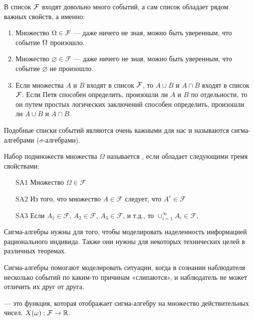 \documentclass[12pt, a4paper, oneside]{article}
\begin{document}
В список $\mathcal{F}$ входят довольно много событий, а сам список обладает рядом важных свойств, а именно:

\begin{enumerate}
\item  Множество $\Omega \in \mathcal{F}$ --- даже ничего не зная, можно быть уверенным, что событие $\Omega$ произошло.

\item  Множество $\varnothing \in \mathcal{F}$ --- даже ничего не зная, можно быть уверенным, что событие $\varnothing$ не произошло.

\item  Если множества $A$ и $B$ входят в список $\mathcal{F}$, то $A\cup B$ и $A\cap B$ входят в список $\mathcal{F}$. Если Петя способен определить, произошли ли $A$ и $B$ по отдельности, то он путем простых логических заключений способен определить, произошли ли $A\cup B$ и $A\cap B$.
\end{enumerate}

Подобные списки событий являются очень важными для нас и называются сигма-алгебрами ($\sigma$-алгебрами).

\begin{definition}  Набор подмножеств множества $\Omega$ называется , если обладает следующими тремя свойствами:

\begin{enumerate}
\item[SA1] Множество $\Omega \in \mathcal{F}$

\item[SA2] Из того, что множество $A\in \mathcal{F}$ следует, что $A^{c}\in \mathcal{F}$

\item[SA3] Если $A_{1}\in\mathcal{F}$, $A_{2}\in\mathcal{F}$, $A_{3}\in\mathcal{F}$, и т.д., то $\cup_{i=1}^{\infty} A_{i} \in\mathcal{F}$.
\end{enumerate}
\end{definition} 

Сигма-алгебры нужны для того, чтобы моделировать наделенность информацией рационального индивида. Также они нужны для некоторых технических целей в различных теоремах. 

Сигма-алгебры помогают моделировать ситуации, когда в сознании наблюдателя несколько событий по каким-то причинам «слипаются», и наблюдатель не может отличить их друг от друга. 

\begin{definition}
 --- это функция, которая отображает сигма-алгебру на множество действительных чисел, $X(\omega) : \mathcal{F} \to \mathbb{R}$.
\end{definition} 
\end{document}
